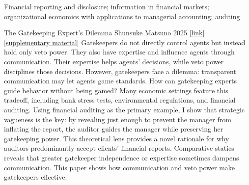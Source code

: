 \newcommand{\co}{\textsuperscript{†}}




\begin{cventries}

\cventryLONG
	{Financial reporting and disclosure; information in financial markets; organizational economics with applications to managerial accounting; auditing}  

\end{cventries}

\vspace{.3cm}


\paperentry
	{The Gatekeeping Expert's Dilemma}   %
	{Shunsuke Matsuno}   %
	{2025}   %
	{\href{https://shunsukematsuno.github.io/papers/JMP_matsuno.pdf}{[link]} \href{https://shunsukematsuno.github.io/papers/supplementary-material_Gatekeeping-Experts-Dilemma.pdf}{[supplementary material]}}  %
	{}   %
	{}   %
	{}   %
	{%
	Gatekeepers do not directly control agents but instead hold only veto power. They also have expertise and influence agents through communication. Their expertise helps agents' decisions, while veto power disciplines those decisions. However, gatekeepers face a dilemma: transparent communication may let agents game standards. How can gatekeeping experts guide behavior without being gamed? Many economic settings feature this tradeoff, including bank stress tests, environmental regulations, and financial auditing. Using financial auditing as the primary example, I show that strategic vagueness is the key: by revealing just enough to prevent the manager from inflating the report, the auditor guides the manager while preserving her gatekeeping power. This theoretical lens provides a novel rationale for why auditors predominantly accept clients' financial reports. Comparative statics reveals that greater gatekeeper independence or expertise sometimes dampens communication. This paper shows how communication and veto power make gatekeepers effective.
	}

